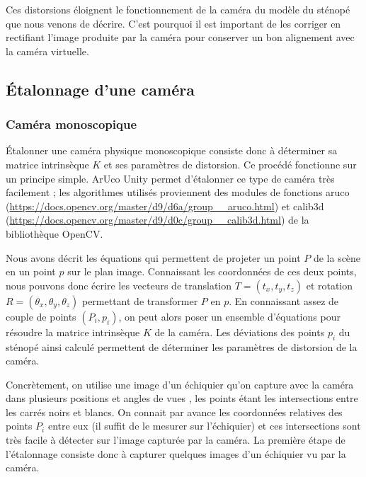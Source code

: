 Ces distorsions éloignent le fonctionnement de la caméra du modèle du sténopé que nous venons de décrire. C'est pourquoi il est important de les corriger en rectifiant l'image produite par la caméra pour conserver un bon alignement avec la caméra virtuelle.

\subsection{Étalonnage d'une caméra}
\subsubsection{Caméra monoscopique}
Étalonner une caméra physique monoscopique consiste donc à déterminer sa matrice intrinsèque $K$ et ses paramètres de distorsion. Ce procédé fonctionne sur un principe simple. ArUco Unity permet d'étalonner ce type de caméra très facilement ; les algorithmes utilisés proviennent des modules de fonctions aruco (\url{https://docs.opencv.org/master/d9/d6a/group__aruco.html}) et calib3d (\url{https://docs.opencv.org/master/d9/d0c/group__calib3d.html}) de la bibliothèque OpenCV.

Nous avons décrit les équations qui permettent de projeter un point $P$ de la scène en un point $p$ sur le plan image. Connaissant les coordonnées de ces deux points, nous pouvons donc écrire les vecteurs de translation $T = (t_x, t_y, t_z)$ et rotation $R = (\theta_x, \theta_y, \theta_z)$ permettant de transformer $P$ en $p$. En connaissant assez de couple de points $(P_i, p_i)$, on peut alors poser un ensemble d'équations pour résoudre la matrice intrinsèque $K$ de la caméra. Les déviations des points $p_i$ du sténopé ainsi calculé permettent de déterminer les paramètres de distorsion de la caméra.

Concrètement, on utilise une image d'un échiquier qu'on capture avec la caméra dans plusieurs positions et angles de vues , les points étant les intersections entre les carrés noirs et blancs. On connait par avance les coordonnées relatives des points $P_i$ entre eux (il suffit de le mesurer sur l'échiquier) et ces intersections sont très facile à détecter sur l'image capturée par la caméra. La première étape de l'étalonnage consiste donc à capturer quelques images d'un échiquier vu par la caméra.


